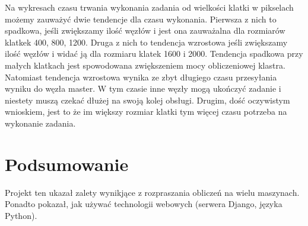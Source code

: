 \documentclass[a4paper]{article}
\begin{document}
Na wykresach czasu trwania wykonania zadania od wielkości klatki w pikselach możemy zauważyć dwie tendencje dla czasu wykonania. Pierwsza z nich to spadkowa, jeśli zwiększamy ilość węzłów i jest ona zauważalna dla rozmiarów klatkek 400, 800, 1200. Druga z nich to tendencja wzrostowa jeśli zwiększamy ilość węzłów i widać ją dla rozmiaru klatek 1600 i 2000. Tendencja spadkowa przy małych klatkach jest spowodowana zwiększeniem mocy obliczeniowej klastra. Natomiast tendencja wzrostowa wynika ze zbyt długiego czasu przesyłania wyniku do węzła master. W tym czasie inne węzły mogą ukończyć zadanie i niestety muszą czekać dłużej na swoją kolej obsługi. Drugim, dość oczywistym wnioskiem, jest to że im większy rozmiar klatki tym więcej czasu potrzeba na wykonanie zadania.

\section{Podsumowanie}
Projekt ten ukazał zalety wynikjące z rozpraszania obliczeń na wielu maszynach. Ponadto pokazał, jak używać technologii webowych (serwera Django, języka Python).
\end{document}
